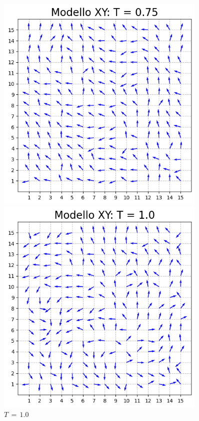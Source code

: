 \begin{figure}[H]
    \begin{minipage}{0.45\textwidth}  
        \centering
        \includegraphics[page=1, width=0.9\textwidth]{Immagini/simModelloXY/conf_T0.75.png}
        \caption{$T\,=\,0.75$}
      \end{minipage}\hfill
      \begin{minipage}{0.45\textwidth}  
        \centering
        \includegraphics[page=1, width=0.9\textwidth]{Immagini/simModelloXY/conf_T1.0.png}
        \caption{$T\,=\,1.0$}
    \end{minipage}
    \vspace{12pt}
  

\end{figure}
